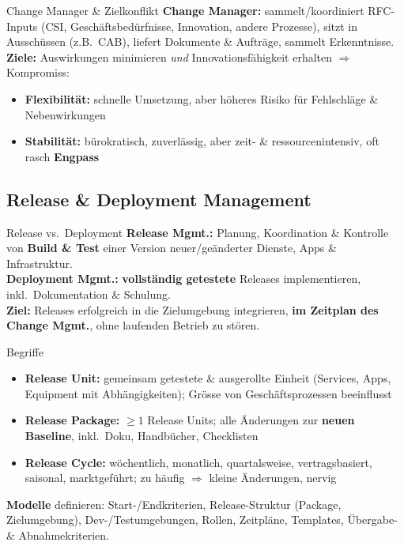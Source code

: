 \documentclass[a4paper, fontsize=7pt]{scrartcl}
\begin{document}
\begin{mainbox}{Change Manager \& Zielkonflikt}
\textbf{Change Manager:} sammelt/koordiniert RFC-Inputs (CSI,
Geschäftsbedürfnisse, Innovation, andere Prozesse), sitzt in Ausschüssen
(z.B.\ CAB), liefert Dokumente \& Aufträge, sammelt Erkenntnisse.\\
\textbf{Ziele:} Auswirkungen minimieren \emph{und} Innovationsfähigkeit
erhalten $\Rightarrow$ Kompromiss:
\begin{itemize}
    \item \textbf{Flexibilität:} schnelle Umsetzung, aber höheres Risiko
          für Fehlschläge \& Nebenwirkungen
    \item \textbf{Stabilität:} bürokratisch, zuverlässig, aber zeit- \&
          ressourcenintensiv, oft rasch \textbf{Engpass}
\end{itemize}
\end{mainbox}

\subsection{Release \& Deployment Management}

\begin{mainbox}{Release vs.\ Deployment}
\textbf{Release Mgmt.:} Planung, Koordination \& Kontrolle von \textbf{Build \&
Test} einer Version neuer/geänderter Dienste, Apps \& Infrastruktur.\\
\textbf{Deployment Mgmt.:} \textbf{vollständig getestete} Releases
implementieren, inkl.\ Dokumentation \& Schulung.\\
\textbf{Ziel:} Releases erfolgreich in die Zielumgebung integrieren,
\textbf{im Zeitplan des Change Mgmt.}, ohne laufenden Betrieb zu stören.
\end{mainbox}

\begin{mainbox}{Begriffe}
\begin{itemize}
    \item \textbf{Release Unit:} gemeinsam getestete \& ausgerollte Einheit
          (Services, Apps, Equipment mit Abhängigkeiten); Grösse von
          Geschäftsprozessen beeinflusst
    \item \textbf{Release Package:} $\ge 1$ Release Units; alle Änderungen
          zur \textbf{neuen Baseline}, inkl.\ Doku, Handbücher, Checklisten
    \item \textbf{Release Cycle:} wöchentlich, monatlich, quartalsweise,
          vertragsbasiert, saisonal, marktgeführt; zu häufig $\Rightarrow$
          kleine Änderungen, nervig
\end{itemize}
\textbf{Modelle} definieren: Start-/Endkriterien, Release-Struktur
(Package, Zielumgebung), Dev-/Testumgebungen, Rollen, Zeitpläne, Templates,
Übergabe- \& Abnahmekriterien.
\end{mainbox}
\end{document}

